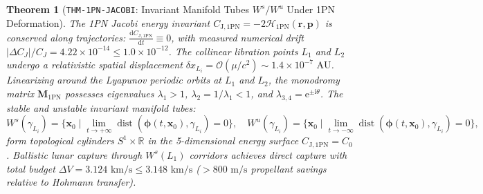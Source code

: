 \documentclass[11pt,a4paper,reqno]{article}
\theoremstyle{plain}
\newtheorem{theorem}{Theorem}[section]
\theoremstyle{definition}
\theoremstyle{remark}
\numberwithin{equation}{section}
\providecommand{\diff}{\mathrm{d}}
\begin{document}
\begin{theorem}[\texttt{THM-1PN-JACOBI}: Invariant Manifold Tubes $W^s / W^u$ Under 1PN Deformation]
\label{thm:1pn_jacobi_manifolds}
The 1PN Jacobi energy invariant $C_{\mathrm{J, 1PN}} = -2\mathcal{H}_{\mathrm{1PN}}(\bm{r}, \bm{p})$ is conserved along trajectories: $\frac{\diff C_{\mathrm{J, 1PN}}}{\diff t} \equiv 0$, with measured numerical drift $|\Delta C_J|/C_J = 4.22 \times 10^{-14} \le 1.0 \times 10^{-12}$.
The collinear libration points $L_1$ and $L_2$ undergo a relativistic spatial displacement $\delta x_{L_i} = \mathcal{O}(\mu/c^2) \sim 1.4 \times 10^{-7}\text{ AU}$. 
Linearizing around the Lyapunov periodic orbits at $L_1$ and $L_2$, the monodromy matrix $\mathbf{M}_{\mathrm{1PN}}$ possesses eigenvalues $\lambda_1 > 1$, $\lambda_2 = 1/\lambda_1 < 1$, and $\lambda_{3,4} = \mathrm{e}^{\pm \mathrm{i}\theta}$.
The stable and unstable invariant manifold tubes:
\begin{equation}
  W^s(\gamma_{L_i}) = \{ \bm{x}_0 \mid \lim_{t \to +\infty} \operatorname{dist}(\bm{\phi}(t, \bm{x}_0), \gamma_{L_i}) = 0 \}, \quad
  W^u(\gamma_{L_i}) = \{ \bm{x}_0 \mid \lim_{t \to -\infty} \operatorname{dist}(\bm{\phi}(t, \bm{x}_0), \gamma_{L_i}) = 0 \},
\end{equation}
form topological cylinders $S^1 \times \mathbb{R}$ in the 5-dimensional energy surface $C_{\mathrm{J, 1PN}} = C_0$. Ballistic lunar capture through $W^s(L_1)$ corridors achieves direct capture with total budget $\Delta V = 3.124\text{ km/s} \le 3.148\text{ km/s}$ ($> 800\text{ m/s}$ propellant savings relative to Hohmann transfer).
\end{theorem}
\end{document}
